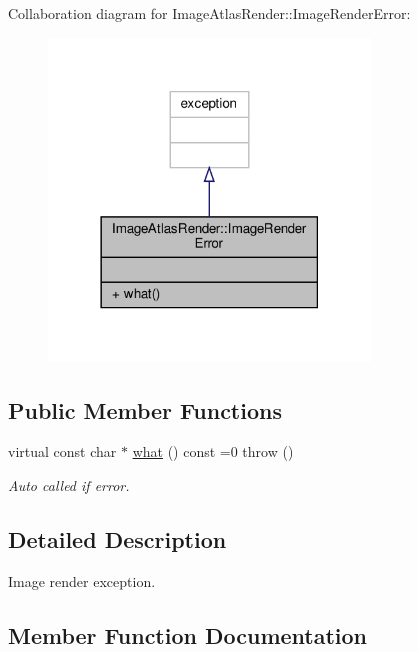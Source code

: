 Collaboration diagram for Image\+Atlas\+Render\+:\+:Image\+Render\+Error\+:
\nopagebreak
\begin{figure}[H]
\begin{center}
\leavevmode
\includegraphics[width=242pt]{class_image_atlas_render_1_1_image_render_error__coll__graph}
\end{center}
\end{figure}
\subsection*{Public Member Functions}
\begin{DoxyCompactItemize}
\item 
virtual const char $\ast$ \hyperlink{class_image_atlas_render_1_1_image_render_error_a62f22cbcb2c3375a5c03de9f60af2bc0}{what} () const =0  throw ()
\begin{DoxyCompactList}\small\item\em Auto called if error. \end{DoxyCompactList}\end{DoxyCompactItemize}


\subsection{Detailed Description}
Image render exception. 

\subsection{Member Function Documentation}
\mbox{\label{class_image_atlas_render_1_1_image_render_error_a62f22cbcb2c3375a5c03de9f60af2bc0}} 
